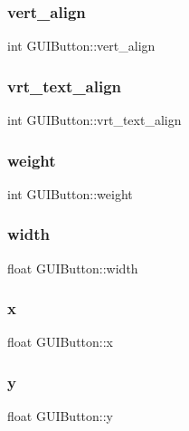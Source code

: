 \subsubsection{\texorpdfstring{vert\+\_\+align}{vert\_align}}
{\footnotesize\ttfamily int G\+U\+I\+Button\+::vert\+\_\+align}

\hypertarget{class_g_u_i_button_a0565c7b6c028d7784b94483a40d9bfb0}{}\label{class_g_u_i_button_a0565c7b6c028d7784b94483a40d9bfb0} 
\subsubsection{\texorpdfstring{vrt\+\_\+text\+\_\+align}{vrt\_text\_align}}
{\footnotesize\ttfamily int G\+U\+I\+Button\+::vrt\+\_\+text\+\_\+align}

\hypertarget{class_g_u_i_button_ac0dcb3c9362c2268e02ebd2bd21808ef}{}\label{class_g_u_i_button_ac0dcb3c9362c2268e02ebd2bd21808ef} 
\subsubsection{\texorpdfstring{weight}{weight}}
{\footnotesize\ttfamily int G\+U\+I\+Button\+::weight}

\hypertarget{class_g_u_i_button_aa3afa57c02d1b909f3124f0ae35e416d}{}\label{class_g_u_i_button_aa3afa57c02d1b909f3124f0ae35e416d} 
\subsubsection{\texorpdfstring{width}{width}}
{\footnotesize\ttfamily float G\+U\+I\+Button\+::width}

\hypertarget{class_g_u_i_button_a96c92133496c72d303c85591a654b89b}{}\label{class_g_u_i_button_a96c92133496c72d303c85591a654b89b} 
\subsubsection{\texorpdfstring{x}{x}}
{\footnotesize\ttfamily float G\+U\+I\+Button\+::x}

\hypertarget{class_g_u_i_button_a9f4443456836e794a33ff93dea5b37dc}{}\label{class_g_u_i_button_a9f4443456836e794a33ff93dea5b37dc} 
\subsubsection{\texorpdfstring{y}{y}}
{\footnotesize\ttfamily float G\+U\+I\+Button\+::y}

